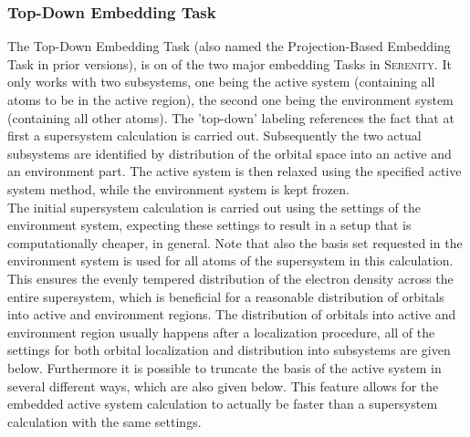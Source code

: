 \documentclass[bibliography=totocnumbered,a4paper,10pt]{scrartcl}
\begin{document}
\clearpage
\subsubsection{Top-Down Embedding Task}
The Top-Down Embedding Task (also named the Projection-Based Embedding Task in prior versions), is on of the two major embedding Tasks
in \textsc{Serenity}.
It only works with two subsystems, one being the active system (containing all atoms to be in the active region), 
the second one being the environment system (containing all other atoms).
The 'top-down' labeling references the fact that at first a supersystem calculation is carried out.
Subsequently the two actual subsystems are identified by distribution of the orbital space into an active and an environment part.
The active system is then relaxed using the specified active system method, while the environment system is kept frozen.\\
The initial supersystem calculation is carried out using the settings of the environment system, expecting these settings
to result in a setup that is computationally cheaper, in general.
Note that also the basis set requested in the environment system is used for all atoms of the supersystem in this calculation.
This ensures the evenly tempered distribution of the electron density across the entire supersystem, which is beneficial for
a reasonable distribution of orbitals into active and environment regions.
The distribution of orbitals into active and environment region usually happens after a localization procedure, all of the settings
for both orbital localization and distribution into subsystems are given below.
Furthermore it is possible to truncate the basis of the active system in several different ways, which are also given below.
This feature allows for the embedded active system calculation to actually be faster than a supersystem calculation with the same
settings.
\end{document}
